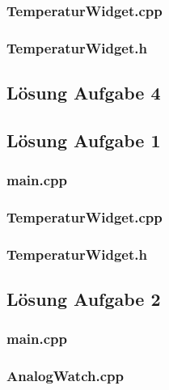 \subsubsection{TemperaturWidget.cpp}

\subsubsection{TemperaturWidget.h}


\subsection{Lösung Aufgabe 4}


\setcounter{section}{14}

\subsection{Lösung Aufgabe 1}
\subsubsection{main.cpp}

\subsubsection{TemperaturWidget.cpp}

\subsubsection{TemperaturWidget.h}


\subsection{Lösung Aufgabe 2}
\subsubsection{main.cpp}

\subsubsection{AnalogWatch.cpp}

